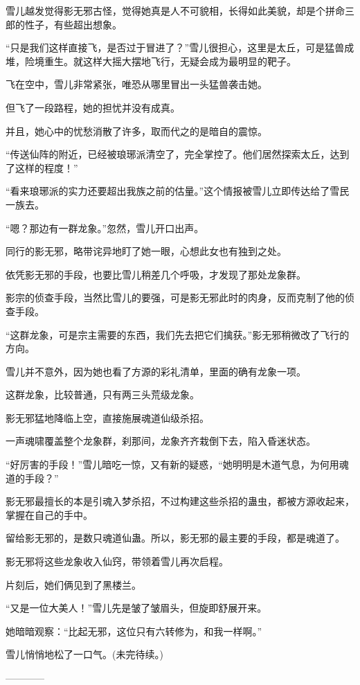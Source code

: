 \begin{this_body}
雪儿越发觉得影无邪古怪，觉得她真是人不可貌相，长得如此美貌，却是个拼命三郎的性子，有些超出想象。

“只是我们这样直接飞，是否过于冒进了？”雪儿很担心，这里是太丘，可是猛兽成堆，险境重生。就这样大摇大摆地飞行，无疑会成为最明显的靶子。

飞在空中，雪儿非常紧张，唯恐从哪里冒出一头猛兽袭击她。

但飞了一段路程，她的担忧并没有成真。

并且，她心中的忧愁消散了许多，取而代之的是暗自的震惊。

“传送仙阵的附近，已经被琅琊派清空了，完全掌控了。他们居然探索太丘，达到了这样的程度！”

“看来琅琊派的实力还要超出我族之前的估量。”这个情报被雪儿立即传达给了雪民一族去。

“嗯？那边有一群龙象。”忽然，雪儿开口出声。

同行的影无邪，略带诧异地盯了她一眼，心想此女也有独到之处。

依凭影无邪的手段，也要比雪儿稍差几个呼吸，才发现了那处龙象群。

影宗的侦查手段，当然比雪儿的要强，可是影无邪此时的肉身，反而克制了他的侦查手段。

“这群龙象，可是宗主需要的东西，我们先去把它们擒获。”影无邪稍微改了飞行的方向。

雪儿并不意外，因为她也看了方源的彩礼清单，里面的确有龙象一项。

这群龙象，比较普通，只有两三头荒级龙象。

影无邪猛地降临上空，直接施展魂道仙级杀招。

一声魂啸覆盖整个龙象群，刹那间，龙象齐齐栽倒下去，陷入昏迷状态。

“好厉害的手段！”雪儿暗吃一惊，又有新的疑惑，“她明明是木道气息，为何用魂道的手段？”

影无邪最擅长的本是引魂入梦杀招，不过构建这些杀招的蛊虫，都被方源收起来，掌握在自己的手中。

留给影无邪的，是数只魂道仙蛊。所以，影无邪的最主要的手段，都是魂道了。

影无邪将这些龙象收入仙窍，带领着雪儿再次启程。

片刻后，她们俩见到了黑楼兰。

“又是一位大美人！”雪儿先是皱了皱眉头，但旋即舒展开来。

她暗暗观察：“比起无邪，这位只有六转修为，和我一样啊。”

雪儿悄悄地松了一口气。(未完待续。)

------------

\end{this_body}

